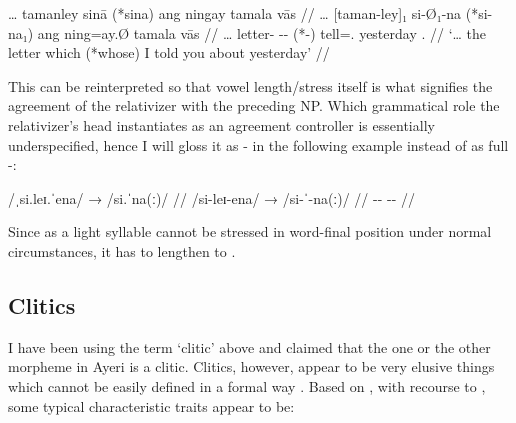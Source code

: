 \ex\begingl
	\gla … tamanley sinā (*sina) ang ningay tamala vās //
	\glb … [taman-ley]₁ si-Ø₁-na (*si-na₁) ang ning=ay.Ø tamala vās //
	\glc … letter-\PargI{} \Rel{}-\PatTI{}-\Gen{} (*\Rel{}-\Gen{}) \AgtT{} 
		tell=\Fsg{}.\Top{} yesterday \Ssg{}.\Parg{} //
	\glft `… the letter which (*whose) I told you about yesterday' //
\endgl\xe

This can be reinterpreted so that vowel length/stress itself is what signifies 
the agreement of the relativizer with the preceding NP. Which grammatical role 
the relativizer's head instantiates as an agreement controller is essentially 
underspecified, hence I will gloss it as -\Agr{} in the following example 
instead of as full -\PargI{}:

\ex[everygla=\upshape]\begingl
	\gla /ˌsi.leɪ.ˈena/ → /si.ˈna(ː)/ //
	\glb /si-leɪ-ena/ → /si-ˈ-na(ː)/ //
	\glc \Rel{}-\PargI{}-\Gen{} {} \Rel{}-\Agr{}-\Gen{} //
\endgl\xe

Since  as a light syllable cannot be stressed in word-final 
position under normal circumstances, it has to lengthen to .


\subsection{Clitics}

I have been using the term `clitic' above and claimed that the one or the 
other morpheme in Ayeri is a clitic. Clitics, however, appear to be very 
elusive things which cannot be easily defined in a formal way 
\citep[126]{spencerluis2012}. Based on \citet{spencerluis2012}, with recourse to \citet{zwickypullum1983}, some typical characteristic traits appear to be:

